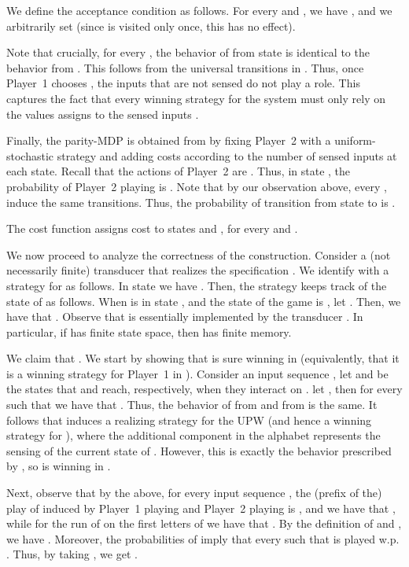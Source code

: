 \documentclass[runningheads,a4paper]{llncs}
\begin{document}
{We define the acceptance condition  as follows. For every  and , we have , and we arbitrarily set  (since  is visited only once, this has no effect).

Note that crucially, for every , the behavior of  from state  is identical to the behavior from . This follows from the universal transitions in . Thus, once Player~1 chooses , the inputs that are not sensed do not play a role. This captures the fact that every winning strategy for the system must only rely on the values  assigns to the sensed inputs .

Finally, the parity-MDP  is obtained from  by fixing Player~2 with a uniform-stochastic strategy and adding costs according to the number of sensed inputs at each state. Recall that the actions of Player~2 are . Thus, in state , the probability of Player~2 playing  is . Note that by our observation above, every , induce the same transitions. Thus, the probability of transition from state  to  is .

The cost function assigns cost  to states  and , for every  and .

We now proceed to analyze the correctness of the construction. Consider a (not necessarily finite) transducer  that realizes the specification . We identify with  a strategy  for  as follows. 
In state  we have . Then, the strategy  keeps track of the state of  as follows. When  is in state , and the state of the game is , let . Then, we have that . Observe that  is essentially implemented by the transducer . In particular, if  has finite state space, then  has finite memory.

We claim that . We start by showing that  is sure winning in  (equivalently, that it is a winning strategy for Player~1 in ). Consider an input sequence , let  and  be the states that  and  reach, respectively, when they interact on . let , then for every  such that  we have that . Thus, the behavior of  from  and from  is the same. It follows that  induces a realizing strategy for the UPW  (and hence a winning strategy for ), where the additional  component in the alphabet represents the sensing of the current state of . However, this is exactly the behavior prescribed by , so  is winning in . 

Next, observe that by the above, for every input sequence , the (prefix of the) play of  induced by Player~1 playing  and Player~2 playing  is  , and we have that , while for the run  of  on the first  letters of  we have that . By the definition of  and , we have . Moreover, the probabilities of  imply that every  such that  is played w.p. . Thus, by taking , we get . 

}
\end{document}
